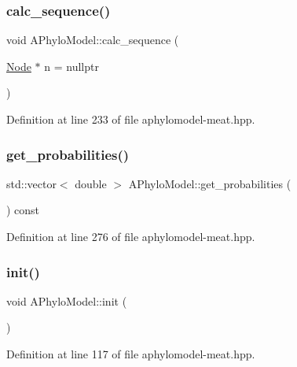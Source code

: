 \subsubsection{\texorpdfstring{calc\+\_\+sequence()}{calc\_sequence()}}
{\footnotesize\ttfamily void A\+Phylo\+Model\+::calc\+\_\+sequence (\begin{DoxyParamCaption}\item[{\hyperlink{class_node}{Node} $\ast$}]{n = {\ttfamily nullptr} }\end{DoxyParamCaption})}



Definition at line 233 of file aphylomodel-\/meat.\+hpp.

\mbox{\label{class_a_phylo_model_a3368d03919454f68f0cb5bd888f983a1}} 
\subsubsection{\texorpdfstring{get\+\_\+probabilities()}{get\_probabilities()}}
{\footnotesize\ttfamily std\+::vector$<$ double $>$ A\+Phylo\+Model\+::get\+\_\+probabilities (\begin{DoxyParamCaption}{ }\end{DoxyParamCaption}) const}



Definition at line 276 of file aphylomodel-\/meat.\+hpp.

\mbox{\label{class_a_phylo_model_a45a7af583f9619bce5d88b15303a73e6}} 
\subsubsection{\texorpdfstring{init()}{init()}}
{\footnotesize\ttfamily void A\+Phylo\+Model\+::init (\begin{DoxyParamCaption}{ }\end{DoxyParamCaption})}



Definition at line 117 of file aphylomodel-\/meat.\+hpp.

\mbox{\label{class_a_phylo_model_a66fced3b89fe385862318621855fa605}} 
